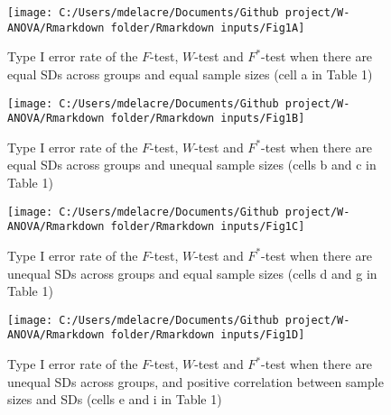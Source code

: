 \documentclass[
  english,
  man]{apa6}
\begin{document}
\begin{landscape}
\newpage

\begin{figure}

{\centering \texttt{[image: C:/Users/mdelacre/Documents/Github project/W-ANOVA/Rmarkdown folder/Rmarkdown inputs/Fig1A]} 

}

\caption{Type I error rate of the $F$-test, $W$-test and $F^*$-test when there are equal SDs across groups and equal sample sizes (cell a in Table 1)}\label{fig:Fig5}
\end{figure}

\end{landscape}
\newpage
\begin{landscape}

\begin{figure}

{\centering \texttt{[image: C:/Users/mdelacre/Documents/Github project/W-ANOVA/Rmarkdown folder/Rmarkdown inputs/Fig1B]} 

}

\caption{Type I error rate of the $F$-test, $W$-test and $F^*$-test when there are equal SDs across groups and unequal sample sizes (cells b and c in Table 1)}\label{fig:Fig6}
\end{figure}

\end{landscape}
\newpage
\begin{landscape}

\begin{figure}

{\centering \texttt{[image: C:/Users/mdelacre/Documents/Github project/W-ANOVA/Rmarkdown folder/Rmarkdown inputs/Fig1C]} 

}

\caption{Type I error rate of the $F$-test, $W$-test and $F^*$-test when there are unequal SDs across groups and equal sample sizes (cells d and g in Table 1)}\label{fig:Fig7}
\end{figure}

\end{landscape}
\newpage
\begin{landscape}

\begin{figure}

{\centering \texttt{[image: C:/Users/mdelacre/Documents/Github project/W-ANOVA/Rmarkdown folder/Rmarkdown inputs/Fig1D]} 

}

\caption{Type I error rate of the $F$-test, $W$-test and $F^*$-test when there are unequal SDs across groups, and positive correlation between sample sizes and SDs (cells e and i in Table 1)}\label{fig:Fig8}
\end{figure}

\end{landscape}
\end{document}
